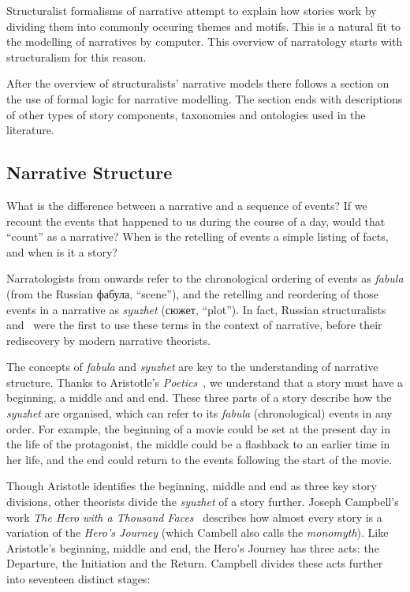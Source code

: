 \documentclass[11pt]{report}
\begin{document}
Structuralist formalisms of narrative attempt to explain how stories work by dividing them into commonly occuring themes and motifs. This is a natural fit to the modelling of narratives by computer. This overview of narratology starts with structuralism for this reason.

After the overview of structuralists' narrative models there follows a section on the use of formal logic for narrative modelling. The section ends with descriptions of other types of story components, taxonomies and ontologies used in the literature.

\subsection{Narrative Structure}
\label{sec:structure}
What is the difference between a narrative and a sequence of events? If we
recount the events that happened to us during the course of a day, would that
``count'' as a narrative? When is the retelling of events a simple listing of
facts, and when is it a story?

Narratologists from \citet{bal2009narratology} onwards refer to the
chronological ordering of events as \emph{fabula} (from the Russian фабула, ``scene''), and the retelling and
reordering of those events in a narrative as \emph{syuzhet} (сюжет, ``plot'').
In fact, Russian structuralists~\citet{propp1968morphology} and~\citet{shklovsky1991theory} were the first to use these terms in the
context of narrative, before their rediscovery by modern narrative theorists.

The concepts of \emph{fabula} and \emph{syuzhet} are key to the understanding of
narrative structure. Thanks to Aristotle's
\emph{Poetics}~\citep{halliwell1986aristotle}, we understand that a story must
have a beginning, a middle and and end. These three parts of a story describe
how the \emph{syuzhet} are organised, which can refer to its \emph{fabula}
(chronological) events in any order. For example, the beginning of a movie could
be set at the present day in the life of the protagonist, the middle could be a
flashback to an earlier time in her life, and the end could return to the events
following the start of the movie.

Though Aristotle identifies the beginning, middle and end as three key story
divisions, other theorists divide the \emph{syuzhet} of a story further. Joseph
Campbell's work \emph{The Hero with a Thousand Faces}~\citep{campbell2008hero}
describes how almost every story is a variation of the \emph{Hero's Journey}
(which Cambell also calls the \emph{monomyth}). Like Aristotle's beginning, middle and end,
the Hero's Journey has three acts: the Departure, the Initiation and the Return.
Campbell divides these acts further into seventeen distinct stages:
\end{document}
